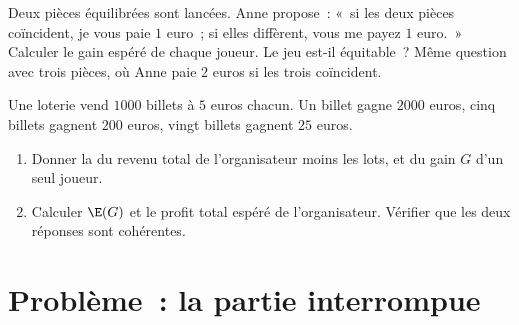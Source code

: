\begin{exercise}[$\star\star$]\label{exo:g11:prob:10}
Deux pièces équilibrées sont lancées. Anne propose~: «~si les deux
pièces coïncident, je vous paie $1$ euro~; si elles diffèrent, vous me
payez $1$ euro.~» Calculer le gain espéré de chaque joueur. Le jeu
est-il équitable~? Même question avec trois pièces, où Anne paie
$2$ euros si les trois coïncident.
\end{exercise}

\begin{exercise}[$\star\star\star$]\label{exo:g11:prob:11}
Une loterie vend $1000$ billets à $5$ euros chacun. Un billet gagne
$2000$ euros, cinq billets gagnent $200$ euros, vingt billets gagnent
$25$ euros.
\begin{enumerate}
  \item Donner la  du revenu total de l'organisateur moins les lots,
        et du gain $G$ d'un seul joueur.
  \item Calculer $\E(G)$ et le profit total espéré de l'organisateur.
        Vérifier que les deux réponses sont cohérentes.
\end{enumerate}
\end{exercise}

\section{Problème~: la partie interrompue}

